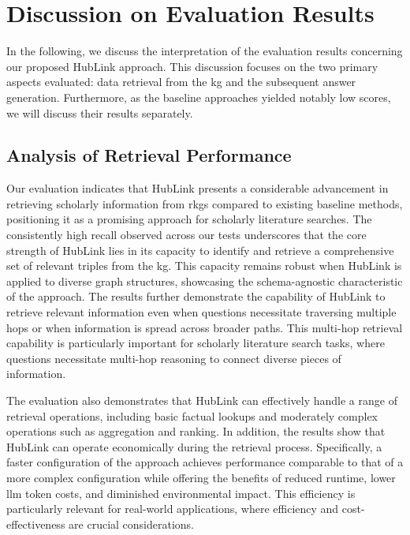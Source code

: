 

\section{Discussion on Evaluation Results}
\label{sec:discussion_on_evaluation_results}


In the following, we discuss the interpretation of the evaluation results concerning our proposed HubLink approach. This discussion focuses on the two primary aspects evaluated: data retrieval from the \gls{kg} and the subsequent answer generation. Furthermore, as the baseline approaches yielded notably low scores, we will discuss their results separately.

\subsection{Analysis of Retrieval Performance}

Our evaluation indicates that HubLink presents a considerable advancement in retrieving scholarly information from \glspl{rkg} compared to existing baseline methods, positioning it as a promising approach for scholarly literature searches. The consistently high recall observed across our tests underscores that the core strength of HubLink lies in its capacity to identify and retrieve a comprehensive set of relevant triples from the \gls{kg}. This capacity remains robust when HubLink is applied to diverse graph structures, showcasing the schema-agnostic characteristic of the approach. The results further demonstrate the capability of HubLink to retrieve relevant information even when questions necessitate traversing multiple hops or when information is spread across broader paths. This multi-hop retrieval capability is particularly important for scholarly literature search tasks, where questions necessitate multi-hop reasoning to connect diverse pieces of information.

The evaluation also demonstrates that HubLink can effectively handle a range of retrieval operations, including basic factual lookups and moderately complex operations such as aggregation and ranking. In addition, the results show that HubLink can operate economically during the retrieval process. Specifically, a faster configuration of the approach achieves performance comparable to that of a more complex configuration while offering the benefits of reduced runtime, lower \gls{llm} token costs, and diminished environmental impact. This efficiency is particularly relevant for real-world applications, where efficiency and cost-effectiveness are crucial considerations.

